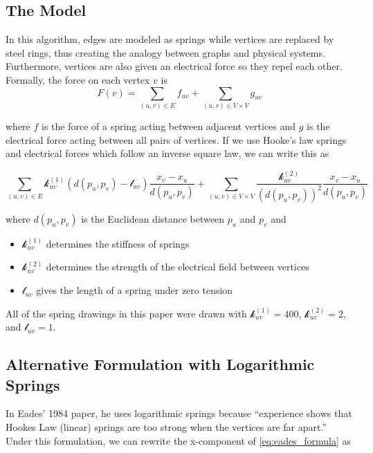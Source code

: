 \documentclass[11pt]{report}
\begin{document}
\subsection{The Model}
In this algorithm, edges are modeled as springs while vertices are replaced by steel rings, thus creating the analogy between graphs and physical systems. Furthermore, vertices are also given an electrical force so they repel each other.~\cite{eades1984heuristic} Formally, the force on each vertex $v$ is
\begin{equation}\label{eq:eades_formula}
    F(v) = \sum_{(u, v) \in E} f_{uv} + \sum_{(u, v) \in V \times V} g_{uv}
\end{equation}

where $f$ is the force of a spring acting between adjacent vertices and $g$ is the electrical force acting between all pairs of vertices. If we use Hooke's law springs and electrical forces which follow an inverse square law, we can write this as

\begin{equation}
    \sum_{(u, v) \in E} \mathcal{k}_{uv}^{(1)} ( d(p_u, p_v) - \mathcal{l}_{uv} ) \frac{x_v - x_u}{d(p_u, p_v)} +
    \sum_{(u, v) \in V \times V} \frac{\mathcal{k}_{uv}^{(2)}}{( d(p_u, p_v) )^2 }  \frac{x_v - x_u}{d(p_u, p_v)}
\end{equation}

where $d(p_u, p_v)$ is the Euclidean distance between $p_u$ and $p_v$ and
\begin{itemize}
    \item $\mathcal{k}_{uv}^{(1)}$ determines the stiffness of springs
    \item $\mathcal{k}_{uv}^{(2)}$ determines the strength of the electrical field between vertices
    \item $\mathcal{l}_{uv}$ gives the length of a spring under zero tension
\end{itemize}

All of the spring drawings in this paper were drawn with $\mathcal{k}_{uv}^{(1)} = 400$, $\mathcal{k}_{uv}^{(2)} = 2$, and $\mathcal{l}_{uv} = 1$.

\subsection{Alternative Formulation with Logarithmic Springs}
In Eades' 1984 paper, he uses logarithmic springs because ``experience shows that Hookes Law (linear) springs are too strong when the vertices are far apart.''~\cite{eades1984heuristic} Under this formulation, we can rewrite the x-component of \ref{eq:eades_formula} as
\end{document}

